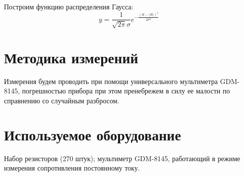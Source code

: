 \documentclass[12pt]{article}
\begin{document}
    \par Построим функцию распределения Гаусса:
    \begin{equation}
        y = \frac{1}{\sqrt{2\pi}\sigma}e^{-\frac{(R - \langle R\rangle)^2}{2\sigma^2}}
    \end{equation}

    \section{Методика измерений}
    Измерения будем проводить при помощи универсального мультиметра GDM-8145, погрешностью
    прибора при этом пренебрежем в силу ее малости по справнению со случайным разбросом.

    \section{Используемое оборудование}
    Набор резисторов (270 штук); мультиметр GDM-8145, работающий в режиме
    измерения сопротивления постоянному току.
    
\end{document}
